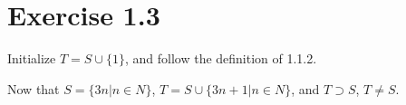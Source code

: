 \section*{Exercise 1.3}

Initialize $T = S \cup \{1\}$, and follow the definition of 1.1.2.

Now that
$S  = \{ 3n | n \in N \}$,
$T = S \cup \{3n+1 | n \in N\}$,
and $T \supset S$,  $ T \neq S $.
